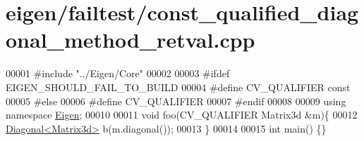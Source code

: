 \hypertarget{eigen_2failtest_2const__qualified__diagonal__method__retval_8cpp_source}{}\section{eigen/failtest/const\+\_\+qualified\+\_\+diagonal\+\_\+method\+\_\+retval.cpp}
\label{eigen_2failtest_2const__qualified__diagonal__method__retval_8cpp_source}

\begin{DoxyCode}
00001 \textcolor{preprocessor}{#include "../Eigen/Core"}
00002 
00003 \textcolor{preprocessor}{#ifdef EIGEN\_SHOULD\_FAIL\_TO\_BUILD}
00004 \textcolor{preprocessor}{#define CV\_QUALIFIER const}
00005 \textcolor{preprocessor}{#else}
00006 \textcolor{preprocessor}{#define CV\_QUALIFIER}
00007 \textcolor{preprocessor}{#endif}
00008 
00009 \textcolor{keyword}{using namespace }\hyperlink{namespace_eigen}{Eigen};
00010 
00011 \textcolor{keywordtype}{void} foo(CV\_QUALIFIER Matrix3d &m)\{
00012     \hyperlink{group___core___module_class_eigen_1_1_diagonal}{Diagonal<Matrix3d>} b(m.diagonal());
00013 \}
00014 
00015 \textcolor{keywordtype}{int} main() \{\}
\end{DoxyCode}

